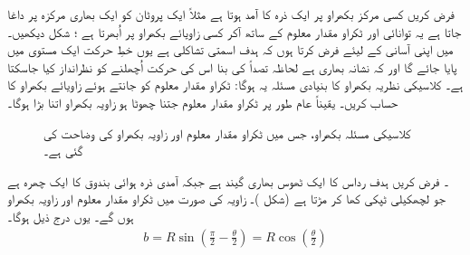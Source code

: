 فرض کریں کسی مرکز بکھراو پر ایک ذرہ کا آمد ہوتا ہے مثلاً ایک پروٹان کو ایک بھاری مرکزہ پر داغا جاتا ہے یہ توانائی   اور ٹکراو مقدار معلوم  کے ساتھ آکر کسی زاویائے بکھراو  پر اُبھرتا ہے  ؛ شکل   دیکھیں۔ میں اپنی آسانی کے لیئے فرض کرتا ہوں کہ ہدف اسمتی تشاکلی ہے یوں خطِ حرکت ایک مستوی میں پایا جائے گا اور کہ نشانہ بھاری ہے لحاظہ تصداً کی بنا اس کی حرکت اُچھلنے کو نظرانداز کیا جاسکتا ہے۔ کلاسیکی نظریہ بکھراو کا بنیادی مسئلہ یہ ہوگا: ٹکراو مقدار معلوم کو جانتے ہوئے زاویائے بکھراو کا حساب کریں۔ یقیناً عام طور پر ٹکراو مقدار معلوم جتنا چھوٹا ہو زاویہ بکھراو اتنا بڑا ہوگا۔
\begin{figure}
\centering
{}
\caption{کلاسیکی مسئلہ بکھراو، جس میں ٹکراو مقدار معلوم  اور زاویہ بکھراو  کی وضاحت کی گئی ہے۔}
\label{شکل_بکھراو_کلاسیکی_ٹکراو_اور_زاویہ}
\end{figure}


۔ فرض کریں ہدف رداس  کا ایک ٹھوس بھاری گیند ہے جبکہ آمدی ذرہ ہوائی بندوق کا ایک چھرہ ہے جو لچھکیلی ٹپکی کھا کر مڑتا ہے  (شکل )۔ زاویہ  کی صورت میں ٹکراو مقدار معلوم  اور زاویہ بکھراو  ہوں گے۔ یوں درج ذیل ہوگا۔
\begin{align}
	b = R\sin\left(\frac{\pi}{2}-\frac{\theta}{2}\right) = R\cos\left(\frac{\theta}{2}\right)
\end{align}

